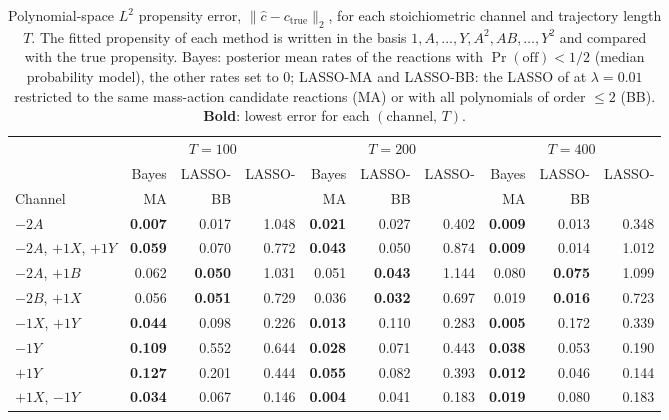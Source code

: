 \begin{table}[htbp]
\centering
\small
\caption{%
  Polynomial-space $L^2$ propensity error, $\|\hat{c} - c_{\mathrm{true}}\|_2$, for each stoichiometric
  channel and trajectory length $T$. The fitted propensity of each method is written in the basis
  $1, A, \dots, Y, A^2, AB, \dots, Y^2$ and compared with the true propensity. Bayes: posterior mean rates of the reactions with
  $\Pr(\text{off})<1/2$ (median probability model), the other rates set to $0$;
  LASSO-MA and LASSO-BB: the LASSO of \cite{siam_Zhang2019} at $\lambda = 0.01$
  restricted to the same mass-action candidate reactions (MA) or with all polynomials of order $\le 2$ (BB).
  \textbf{Bold}: lowest error for each $(\text{channel},\,T)$.
}
\label{tab:comparison-l2}
\setlength{\tabcolsep}{2.5pt}
\begin{tabular}{l rrr rrr rrr}
\toprule
\multicolumn{1}{c}{} & \multicolumn{3}{c}{$T=100$} & \multicolumn{3}{c}{$T=200$} & \multicolumn{3}{c}{$T=400$} \\
\cmidrule(lr){2-4}\cmidrule(lr){5-7}\cmidrule(lr){8-10}
 & Bayes & LASSO- & LASSO- & Bayes & LASSO- & LASSO- & Bayes & LASSO- & LASSO- \\
Channel  & MA & BB &  & MA & BB &  & MA & BB \\
\midrule
$-2A$ & \textbf{0.007} & 0.017 & 1.048 & \textbf{0.021} & 0.027 & 0.402 & \textbf{0.009} & 0.013 & 0.348 \\
$-2A$, $+1X$, $+1Y$ & \textbf{0.059} & 0.070 & 0.772 & \textbf{0.043} & 0.050 & 0.874 & \textbf{0.009} & 0.014 & 1.012 \\
$-2A$, $+1B$ & 0.062 & \textbf{0.050} & 1.031 & 0.051 & \textbf{0.043} & 1.144 & 0.080 & \textbf{0.075} & 1.099 \\
$-2B$, $+1X$ & 0.056 & \textbf{0.051} & 0.729 & 0.036 & \textbf{0.032} & 0.697 & 0.019 & \textbf{0.016} & 0.723 \\
$-1X$, $+1Y$ & \textbf{0.044} & 0.098 & 0.226 & \textbf{0.013} & 0.110 & 0.283 & \textbf{0.005} & 0.172 & 0.339 \\
$-1Y$ & \textbf{0.109} & 0.552 & 0.644 & \textbf{0.028} & 0.071 & 0.443 & \textbf{0.038} & 0.053 & 0.190 \\
$+1Y$ & \textbf{0.127} & 0.201 & 0.444 & \textbf{0.055} & 0.082 & 0.393 & \textbf{0.012} & 0.046 & 0.144 \\
$+1X$, $-1Y$ & \textbf{0.034} & 0.067 & 0.146 & \textbf{0.004} & 0.041 & 0.183 & \textbf{0.019} & 0.080 & 0.183 \\

\end{tabular}
\end{table}
